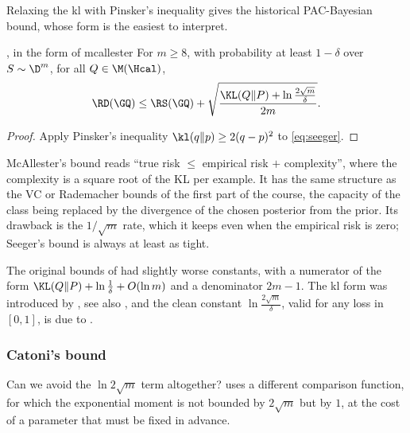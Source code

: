 Relaxing the kl with Pinsker's inequality gives the historical PAC-Bayesian
bound, whose form is the easiest to interpret.

\begin{corollary}{\citet{mcallester1999some,mcallester2003pac}, in the form of \citet{maurer2004note}}{mcallester}
For $m\geq 8$, with probability at least $1-\delta$ over $S\sim\D^m$, for all $Q\in\M(\Hcal)$,
\begin{equation}\label{eq:mcallester}
\RD(\GQ)\leq\RS(\GQ)+\sqrt{\frac{\KL(Q\|P)+\ln\frac{2\sqrt m}{\delta}}{2m}}.
\end{equation}
\end{corollary}
\begin{proof}
Apply Pinsker's inequality $\kl(q\|p)\geq2(q-p)^2$ to \eqref{eq:seeger}.
\end{proof}

McAllester's bound reads ``true risk $\leq$ empirical risk $+$ complexity'',
where the complexity is a square root of the KL per example. It has the same
structure as the VC or Rademacher bounds of the first part of the course, the
capacity of the class being replaced by the divergence of the chosen posterior
from the prior. Its drawback is the $1/\sqrt m$ rate, which it keeps even when
the empirical risk is zero; Seeger's bound is always at least as tight.

\begin{history}
The original bounds of \citet{mcallester1998some,mcallester1999some} had
slightly worse constants, with a numerator of the form
$\KL(Q\|P)+\ln\frac1\delta+O(\ln m)$ and a denominator $2m-1$. The kl form was
introduced by \citet{seeger2002pac}, see also \citet{langford2005tutorial}, and the clean
constant $\ln\frac{2\sqrt m}{\delta}$, valid for any loss in $[0,1]$, is due to
\citet{maurer2004note}.
\end{history}

\subsubsection{Catoni's bound}

Can we avoid the $\ln 2\sqrt m$ term altogether? \citet{catoni2007pac} uses a
different comparison function, for which the exponential moment is not bounded
by $2\sqrt m$ but by $1$, at the cost of a parameter that must be fixed in
advance.

